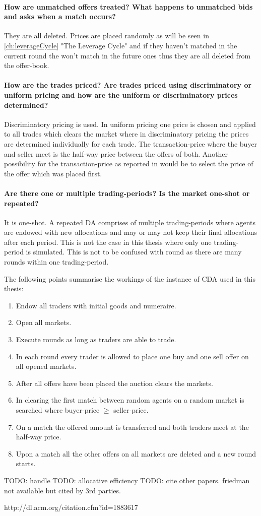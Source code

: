 \documentclass[../Bachelorarbeit.tex]{subfiles}
\begin{document}
\paragraph{How are unmatched offers treated? What happens to unmatched bids and asks when a match occurs?} They are all deleted. Prices are placed randomly as will be seen in \ref{ch:leverageCycle} "The Leverage Cycle" and if they haven't matched in the current round the won't match in the future ones thus they are all deleted from the offer-book.

\paragraph{How are the trades priced? Are trades priced using discriminatory or uniform pricing and how are the uniform or discriminatory prices determined?} Discriminatory pricing is used. In uniform pricing one price is chosen and applied to all trades which clears the market where in discriminatory pricing the prices are determined individually for each trade. The \gls{transaction-price} where the buyer and seller meet is the half-way price between the offers of both. Another possibility for the transaction-price as reported in \cite{GodeSunder1993} would be to select the price of the offer which was placed first.

\paragraph{Are there one or multiple trading-periods? Is the market one-shot or repeated?} It is one-shot. A repeated DA comprises of multiple trading-periods where agents are endowed with new allocations and may or may not keep their final allocations after each period. This is not the case in this thesis where only one trading-period is simulated. This is not to be confused with \Gls{round} as there are many rounds within one trading-period.

\medskip

The following points summarise the workings of the instance of CDA used in this thesis:

\begin{enumerate}
\item Endow all traders with initial goods and numeraire.
\item Open all markets.
\item Execute rounds as long as traders are able to trade.
\item In each round every trader is allowed to place one buy and one sell offer on all opened markets.
\item After all offers have been placed the auction clears the markets.
\item In clearing the first match between random agents on a random market is searched where buyer-price $\geq$ seller-price.
\item On a match the offered amount is transferred and both traders meet at the half-way price.
\item Upon a match all the other offers on all markets are deleted and a new round starts.
\end{enumerate}

\medskip

TODO: handle \cite{GodeSunder1993}
TODO: allocative efficiency
TODO: cite other papers. friedman not available but cited by 3rd parties.

\medskip

http://dl.acm.org/citation.cfm?id=1883617
\end{document}
